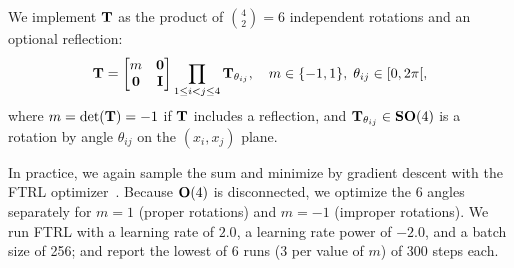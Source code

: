 We implement $\mathbf{T}$ as the product of $\binom{4}{2}=6$ independent rotations and an optional reflection:
\begin{equation*}
    \mathbf{T} =
    \begin{bmatrix}
        m & \mathbf{0} \\
        \mathbf{0} & \mathbf{I} \\
    \end{bmatrix}
    \prod_{1 \leq i < j \leq 4} \mathbf{T}_{\theta_{ij}},
    \quad m \in \{-1,1\}, \; \theta_{ij} \in [0, 2\pi[,
\end{equation*}
where $m = \det(\mathbf{T}) = -1$ if $\mathbf{T}$ includes a reflection, and $\mathbf{T}_{\theta_{ij}} \in \mathrm{\mathbf{SO}}(4)$ is a rotation by angle $\theta_{ij}$ on the $(x_i, x_j)$ plane.

In practice, we again sample the sum and minimize  by gradient descent with the FTRL optimizer~\cite{mcmahan_ad_2013}.
Because $\mathrm{\mathbf{O}}(4)$ is disconnected, we optimize the 6 angles separately for $m = 1$ (proper rotations) and $m = -1$ (improper rotations).
We run FTRL with a learning rate of $2.0$, a learning rate power of $-2.0$, and a batch size of 256; and report the lowest of 6 runs (3 per value of $m$) of 300 steps each.


